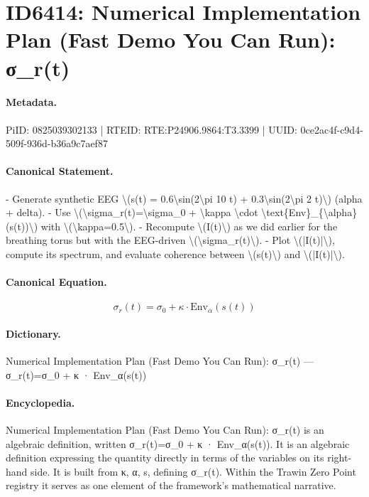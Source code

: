 \section*{ID6414: Numerical Implementation Plan (Fast Demo You Can Run): σ\_r(t)}
\paragraph{Metadata.}
PiID: 0825039302133 | RTEID: RTE:P24906.9864:T3.3399 | UUID: 0ce2ac4f-c9d4-509f-936d-b36a9c7aef87

\paragraph{Canonical Statement.}
- Generate synthetic EEG \textbackslash{}(s(t) = 0.6\textbackslash{}sin(2\textbackslash{}pi 10 t) + 0.3\textbackslash{}sin(2\textbackslash{}pi 2 t)\textbackslash{}) (alpha + delta). - Use \textbackslash{}(\textbackslash{}sigma\_r(t)=\textbackslash{}sigma\_0 + \textbackslash{}kappa \textbackslash{}cdot \textbackslash{}text\{Env\}\_\{\textbackslash{}alpha\}(s(t))\textbackslash{}) with \textbackslash{}(\textbackslash{}kappa=0.5\textbackslash{}). - Recompute \textbackslash{}(I(t)\textbackslash{}) as we did earlier for the breathing torus but with the EEG-driven \textbackslash{}(\textbackslash{}sigma\_r(t)\textbackslash{}). - Plot \textbackslash{}(|I(t)|\textbackslash{}), compute its spectrum, and evaluate coherence between \textbackslash{}(s(t)\textbackslash{}) and \textbackslash{}(|I(t)|\textbackslash{}).

\paragraph{Canonical Equation.}
\[
\sigma_r(t)=\sigma_0 + \kappa \cdot \text{Env}_{\alpha}(s(t))
\]

\paragraph{Dictionary.}
Numerical Implementation Plan (Fast Demo You Can Run): σ\_r(t) — σ\_r(t)=σ\_0 + κ · Env\_α(s(t))

\paragraph{Encyclopedia.}
Numerical Implementation Plan (Fast Demo You Can Run): σ\_r(t) is an algebraic definition, written σ\_r(t)=σ\_0 + κ · Env\_α(s(t)). It is an algebraic definition expressing the quantity directly in terms of the variables on its right-hand side. It is built from κ, α, s, defining σ\_r(t). Within the Trawin Zero Point registry it serves as one element of the framework's mathematical narrative.
